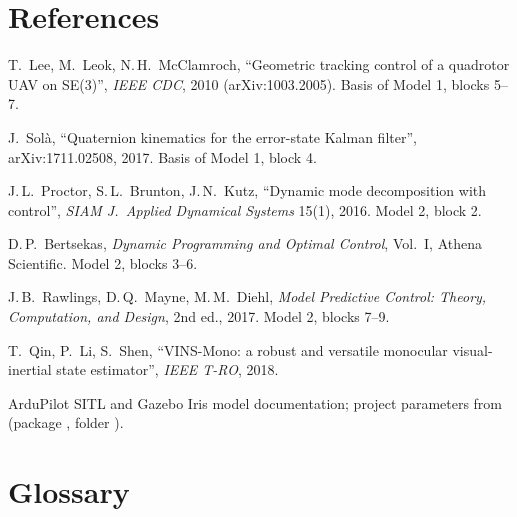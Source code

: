 \section{References}

\begin{enumerate}[label={[\arabic*]}, leftmargin=*]
\item T.~Lee, M.~Leok, N.\,H.~McClamroch, ``Geometric tracking control of a quadrotor UAV on SE(3)'',
      \emph{IEEE CDC}, 2010 (arXiv:1003.2005). Basis of Model 1, blocks 5--7.
\item J.~Sol\`a, ``Quaternion kinematics for the error-state Kalman filter'', arXiv:1711.02508, 2017. Basis of Model 1, block 4.
\item J.\,L.~Proctor, S.\,L.~Brunton, J.\,N.~Kutz, ``Dynamic mode decomposition with control'',
      \emph{SIAM J.\ Applied Dynamical Systems} 15(1), 2016. Model 2, block 2.
\item D.\,P.~Bertsekas, \emph{Dynamic Programming and Optimal Control}, Vol.~I, Athena Scientific. Model 2, blocks 3--6.
\item J.\,B.~Rawlings, D.\,Q.~Mayne, M.\,M.~Diehl, \emph{Model Predictive Control: Theory, Computation, and Design}, 2nd ed., 2017.
      Model 2, blocks 7--9.
\item T.~Qin, P.~Li, S.~Shen, ``VINS-Mono: a robust and versatile monocular visual-inertial state estimator'',
      \emph{IEEE T-RO}, 2018.
\item ArduPilot SITL and Gazebo Iris model documentation; project parameters from
       (package , folder ).
\end{enumerate}

\section{Glossary}
\label{app:glossary}

